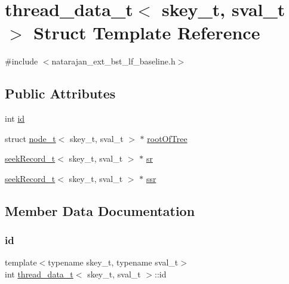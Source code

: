 \hypertarget{structthread__data__t}{}\section{thread\+\_\+data\+\_\+t$<$ skey\+\_\+t, sval\+\_\+t $>$ Struct Template Reference}
\label{structthread__data__t}


{\ttfamily \#include $<$natarajan\+\_\+ext\+\_\+bst\+\_\+lf\+\_\+baseline.\+h$>$}

\subsection*{Public Attributes}
\begin{DoxyCompactItemize}
\item 
int \hyperlink{structthread__data__t_a32492b643fddfe2ef0b74bcaca1427ed}{id}
\item 
struct \hyperlink{structnode__t}{node\+\_\+t}$<$ skey\+\_\+t, sval\+\_\+t $>$ $\ast$ \hyperlink{structthread__data__t_a5c58446e4fb376931c8eefd24b907a0b}{root\+Of\+Tree}
\item 
\hyperlink{structseekRecord__t}{seek\+Record\+\_\+t}$<$ skey\+\_\+t, sval\+\_\+t $>$ $\ast$ \hyperlink{structthread__data__t_a41e98b9f289aa039d8797baf5fcaf886}{sr}
\item 
\hyperlink{structseekRecord__t}{seek\+Record\+\_\+t}$<$ skey\+\_\+t, sval\+\_\+t $>$ $\ast$ \hyperlink{structthread__data__t_afe71f5c29320086b79b63617b00236a0}{ssr}
\end{DoxyCompactItemize}


\subsection{Member Data Documentation}
\mbox{\label{structthread__data__t_a32492b643fddfe2ef0b74bcaca1427ed}} 
\subsubsection{\texorpdfstring{id}{id}}
{\footnotesize\ttfamily template$<$typename skey\+\_\+t, typename sval\+\_\+t$>$ \\
int \hyperlink{structthread__data__t}{thread\+\_\+data\+\_\+t}$<$ skey\+\_\+t, sval\+\_\+t $>$\+::id}

